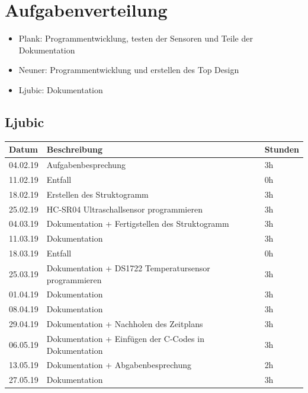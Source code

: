 \documentclass[12pt,a4paper,german]{article}
\begin{document}
\section{Aufgabenverteilung}
\begin{itemize}
	\item{Plank: Programmentwicklung, testen der Sensoren und Teile der 
		Dokumentation}

	\item{Neuner: Programmentwicklung und erstellen des Top Design}

	\item{Ljubic: Dokumentation}
\end{itemize}

\subsection{Ljubic}

\begin{table}[H]
\centering 
\begin{tabularx}{\textwidth}{|l|X|l|}
\hline
\textbf{Datum} & \textbf{Beschreibung} & \textbf{Stunden} \\ 
\hline
\hline
04.02.19 & Aufgabenbesprechung & 3h \\ 
\hline
11.02.19 & Entfall & 0h \\ 
\hline
18.02.19 & Erstellen des Struktogramm  & 3h \\ 
\hline
25.02.19 & HC-SR04 Ultraschallsensor programmieren & 3h \\ 
\hline
04.03.19 & Dokumentation + Fertigstellen des Struktogramm & 3h \\ 
\hline
11.03.19 & Dokumentation & 3h \\ 
\hline
18.03.19 & Entfall & 0h\\ 
\hline
25.03.19 & Dokumentation + DS1722 Temperatursensor programmieren & 3h \\ 
\hline
01.04.19 & Dokumentation & 3h \\ 
\hline
08.04.19 & Dokumentation & 3h \\ 
\hline
29.04.19 & Dokumentation + Nachholen des Zeitplans & 3h \\ 
\hline
06.05.19 & Dokumentation + Einfügen der C-Codes in Dokumentation  & 3h \\ 
\hline
13.05.19 & Dokumentation + Abgabenbesprechung & 2h \\
\hline
27.05.19 & Dokumentation & 3h \\
\hline
\end{tabularx}
\end{table}
\end{document}
